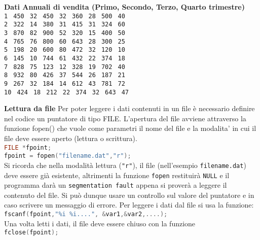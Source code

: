 \documentclass[11pt]{article}
\begin{document}
\begin{mdframed}[backgroundcolor=panna]
{\bf Dati Annuali di vendita (Primo, Secondo, Terzo, Quarto trimestre)}
\\
\texttt{1$\;$	450$\;$	32$\;$	450$\;$             32$\;$       360$\;$         28$\;$            500$\;$        40 \\
           2$\;$	322$\;$	14$\;$ 	380$\;$             31$\;$        415$\;$         31$\;$            324$\;$        60 \\
           3$\;$      870$\;$	82$\;$ 	900$\;$             52$\;$        320$\;$         15$\;$            400$\;$        50\\
           4$\;$      765$\;$	76$\;$ 	800$\;$             60$\;$        643$\;$         28$\;$            300$\;$        25\\
           5$\;$      198$\;$ 	20$\;$ 	600$\;$             80$\;$        472$\;$         32$\;$            120$\;$        10\\
           6$\;$      145$\;$	10$\;$ 	744$\;$             61$\;$        432$\;$         22$\;$            374$\;$        18\\ 
           7$\;$       828$\;$	75$\;$	123$\;$             12$\;$        328$\;$         19$\;$            702$\;$        40\\ 
           8$\;$       932$\;$	80$\;$	426$\;$             37$\;$        544$\;$         26$\;$            187$\;$        21\\
           9$\;$       267$\;$	32$\;$	184$\;$             14$\;$        612$\;$         43$\;$            781$\;$        72\\
           10$\;$	 424$\;$	18$\;$	212$\;$		22$\;$        374$\;$         32$\;$            643$\;$        47}
\end{mdframed}
 
 \begin{mdframed}[backgroundcolor=panna]
 {\bf Lettura da file}
 Per poter leggere i dati contenuti in un file \`{e} necessario definire nel codice un puntatore di tipo FILE. L'apertura del file avviene attraverso la funzione fopen() che vuole come parametri il nome del file e la modalita' in cui il file deve essere aperto (lettura o scrittura).\\
 \lstinline[language=c]!FILE *fpoint;!\\
 \lstinline[language=c]!fpoint = fopen("filename.dat","r");!\\
Si ricorda che nella modalit\`{a} lettura (\texttt{"r"}), il file (nell'esempio \texttt{filename.dat}) deve essere gi\`{a} esistente, altrimenti la funzione  \lstinline[language=c]!fopen! restituir\`{a}  \lstinline[language=c]!NULL! e il programma dar\`{a} un \texttt{segmentation fault} appena si prover\`{a} a leggere il contenuto del file. Si pu\`{o} dunque usare un controllo sul valore del puntatore e in caso scrivere un messaggio di errore. Per leggere i dati dal file si usa  la funzione:\\
\lstinline[language=c]!fscanf(fpoint,"%i %i....", &var1,&var2,....);! \\
Una volta letti i dati, il file deve essere chiuso con la funzione\\
\lstinline[language=c]!fclose(fpoint);!
 \end{mdframed}
 
\end{document}
